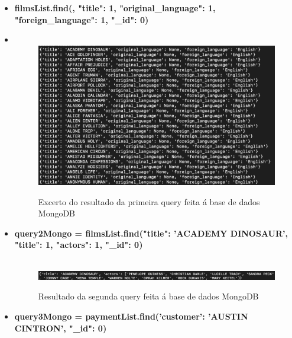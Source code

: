 \begin{itemize}
\item \textbf{filmsList.find({}, {"title": 1, "original\_language": 1, "foreign\_language": 1, "\_id": 0})}

\item 
\begin{figure}[H]

  \centering

  \hbox{\hspace{-11.5em} \includegraphics[scale = 0.45]{mongoQuery1.png}}

  \caption {Excerto do resultado da primeira query feita á base de dados MongoDB}

  \label {fig2}

\end{figure}

\item \textbf{query2Mongo = filmsList.find({"title": 'ACADEMY DINOSAUR'}, {"title": 1, "actors": 1, "\_id": 0})}

\begin{figure}[H]

  \centering

  \hbox{\hspace{-11.5em} \includegraphics[scale = 0.40]{mongoQuery2.png}}

  \caption {Resultado da segunda query feita á base de dados MongoDB}

  \label {fig3}

\end{figure}

\item \textbf{query3Mongo = paymentList.find({'customer': 'AUSTIN CINTRON'}, { "\_id": 0})}


\end{itemize}
